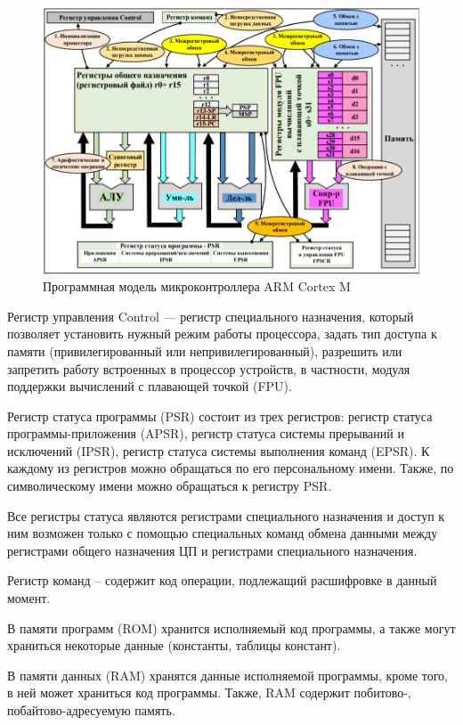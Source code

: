 \documentclass[12pt, oneside]{altsu-report}
\begin{document}
\begin{figure}[!ht]
    \centering
    \includegraphics[scale=0.75]{Program_model_ARM.png}
    \caption{Программная модель микроконтроллера ARM Cortex M~\cite{Program_model_ARM}}
    \label{fig:prog_mod_ARM}
\end{figure}

Регистр управления Control --- регистр специального назначения, который позволяет установить нужный режим работы процессора, задать тип доступа к памяти (привилегированный или непривилегированный), разрешить или запретить работу встроенных в процессор устройств, в частности, модуля поддержки вычислений с плавающей точкой (FPU).

Регистр статуса программы (PSR) состоит из трех регистров: регистр статуса программы-приложения (APSR), регистр статуса системы прерываний и исключений (IPSR), регистр статуса системы выполнения команд (EPSR). К каждому из регистров можно обращаться по его персональному имени. Также, по символическому имени можно обращаться к регистру PSR.

Все регистры статуса являются регистрами специального назначения и доступ к ним возможен только с помощью специальных команд обмена данными между регистрами общего назначения ЦП и регистрами специального назначения.

Регистр команд – содержит код операции, подлежащий расшифровке в данный момент.

В памяти программ (ROM) хранится исполняемый код программы, а также могут храниться некоторые данные (константы, таблицы констант).

В памяти данных (RAM) хранятся данные исполняемой программы, кроме того, в ней может храниться код программы. Также, RAM содержит побитово-, побайтово-адресуемую память.
\end{document}
